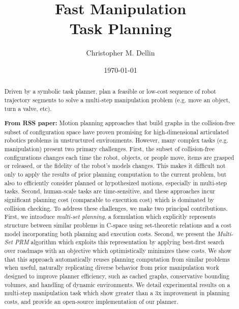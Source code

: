 \documentclass{report}
\title{Fast Manipulation\\Task Planning}
\author{Christopher M. Dellin}
\date{\today}
\begin{document}
\maketitle

\begin{abstract}
Driven by a symbolic task planner, plan a feasible or low-cost sequence of
robot trajectory segments to solve a multi-step manipulation problem
(e.g. move an object, turn a valve, etc).

\textbf{From RSS paper:}
Motion planning approaches that build graphs
in the collision-free subset of configuration space
have proven promising
for high-dimensional articulated robotics problems
in unstructured environments.
However, many complex tasks (e.g. manipulation)
present two primary challenges.
First, the subset of collision-free configurations changes each time
the robot, objects, or people move, items are grasped or released,
or the fidelity of the robot's models changes.
This makes it difficult not only to apply the results of prior
planning computation to the current problem,
but also to efficiently consider planned or hypothesized motions,
especially in multi-step tasks.
Second, human-scale tasks are time-sensitive,
and these approaches incur significant planning cost
(comparable to execution cost)
which is dominated by collision checking.
To address these challenges,
we make two principal contributions.
First, we introduce \emph{multi-set planning},
a formulation which explicitly represents structure
between similar problems in C-space
using set-theoretic relations
and a cost model incorporating both planning and execution costs.
Second, we present the \emph{Multi-Set PRM} algorithm
which exploits this representation
by applying best-first search over roadmaps
with an objective which optimistically minimizes these costs.
We show that this approach automatically reuses planning computation
from similar problems when useful,
naturally replicating diverse behavior from prior
manipulation work designed to improve planner efficiency,
such as cached graphs, conservative bounding volumes,
and handling of dynamic environments.
We detail experimental results on a multi-step
manipulation task which show greater than a 3x improvement
in planning costs,
and provide an open-source implementation of our planner.
\end{abstract}

\tableofcontents
\end{document}
